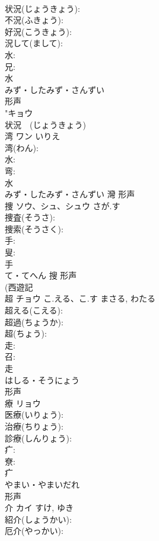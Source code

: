 \documentclass[8pt]{extreport}
\begin{document}
\begin{CJK}{UTF8}{min}
\\	状況(じょうきょう): 
\\	不況(ふきょう): 
\\	好況(こうきょう): 
\\	況して(まして): 
\\	水: 
\\	兄: 
\\	水	
\\	みず・したみず・さんずい	
\\	形声 
\\	"キョウ 
\\	状況　(じょうきょう)　
\\	湾	ワン	いりえ		
\\	湾(わん): 
\\	水: 
\\	弯: 
\\	水	
\\	みず・したみず・さんずい	灣	形声 
\\	捜	ソウ、シュ、シュウ	さが.す		
\\	捜査(そうさ): 
\\	捜索(そうさく): 
\\	手: 
\\	叟: 
\\	手	
\\	て・てへん	搜	形声 
\\	(西遊記 
\\	超	チョウ	こ.える、こ.す	まさる, わたる	
\\	超える(こえる): 
\\	超過(ちょうか): 
\\	超(ちょう): 
\\	走: 
\\	召: 
\\	走	
\\	はしる・そうにょう	
\\	形声 
\\	療	リョウ			
\\	医療(いりょう): 
\\	治療(ちりょう): 
\\	診療(しんりょう): 
\\	疒: 
\\	尞: 
\\	疒	
\\	やまい・やまいだれ	
\\	形声 
\\	介	カイ		すけ, ゆき	
\\	紹介(しょうかい): 
\\	厄介(やっかい): 

\end{CJK}
\end{document}
